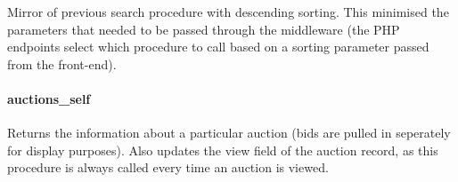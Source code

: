 Mirror of previous search procedure with descending sorting. This
minimised the parameters that needed to be passed through the middleware
(the PHP endpoints select which procedure to call based on a sorting
parameter passed from the front-end).

\begin{Shaded}
\begin{Highlighting}[]
  \NormalTok{(}\NormalTok{), }  \NormalTok{(}\NormalTok{))}
      \NormalTok{*}
       
    
         \NormalTok{))}
         
      
       
                   
                   
                   
                   
        \NormalTok{;}
\end{Highlighting}
\end{Shaded}

\paragraph{auctions\_self}\label{auctionsux5fself}

Returns the information about a particular auction (bids are pulled in
seperately for display purposes). Also updates the view field of the
auction record, as this procedure is always called every time an auction
is viewed.

